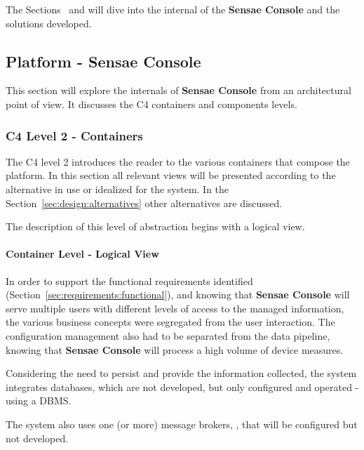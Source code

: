 The Sections~ and  will dive into the internal of the \textbf{Sensae Console} and the solutions developed.

\subsection{Platform - Sensae Console}
\label{subsec:design:architecture:platform}

This section will explore the internals of \textbf{Sensae Console} from an architectural point of view. It discusses the C4 containers and components levels.

\subsubsection{C4 Level 2 - Containers}
\label{subsubsec:design:architecture:platform:containers}

The C4 level 2 introduces the reader to the various containers that compose the platform. In this section all relevant views will be presented according to the alternative in use or idealized for the system. In the Section~\ref{sec:design:alternatives} other alternatives are discussed.

The description of this level of abstraction begins with a logical view.

\paragraph{Container Level - Logical View}
\label{par:design:architecture:platform:container:logical}

In order to support the functional requirements identified (Section~\ref{sec:requirements:functional}), and knowing that \textbf{Sensae Console} will serve multiple users with different levels of access to the managed information, the various business concepts were segregated from the user interaction. The configuration management also had to be separated from the data pipeline, knowing that \textbf{Sensae Console} will process a high volume of device measures.

Considering the need to persist and provide the information collected, the system integrates databases, which are not developed, but only configured and operated - using a \gls{DBMS}.

The system also uses one (or more) message brokers, \cite{broker}, that will be configured but not developed.

